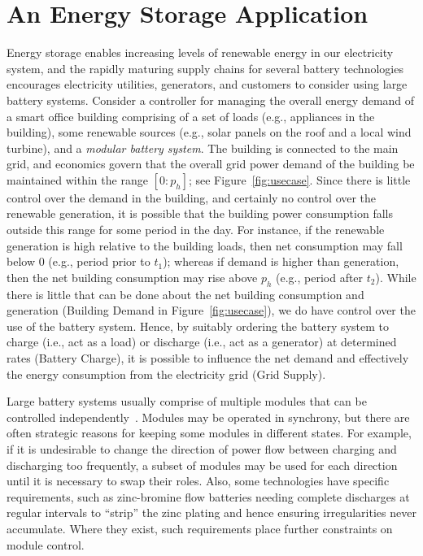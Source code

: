 \section{An Energy Storage Application}\label{sec:application}



Energy storage enables increasing levels of renewable energy in our electricity system, and the rapidly maturing supply chains for several battery technologies encourages electricity utilities, generators, and customers to consider using large battery systems. 
Consider a controller for managing the overall energy demand of a smart office building comprising of a set of loads (e.g., appliances in the building), some renewable sources (e.g., solar panels on the roof and a local wind turbine), and a \emph{modular battery system}. The building is connected to the main grid, and economics govern that the overall grid power demand of the building be maintained within the range $[0:p_h]$; see Figure~\ref{fig:usecase}. 
Since there is little control over the demand in the building, and certainly no control over the renewable generation, it is possible that the building power consumption falls outside this range for some period in the day. For instance, if the renewable generation is high relative to the building loads, then net consumption may fall below $0$ (e.g., period prior to $t_1$); whereas if demand is higher than generation, then the net building consumption may rise above $p_h$ (e.g., period after $t_2$). 
%
While there is little that can be done about the net building consumption and generation (Building Demand in Figure~\ref{fig:usecase}),
we do have control over the use of the battery system. Hence, by suitably ordering the battery system to charge (i.e., act as a load) or discharge (i.e., act as a generator) at determined rates (Battery Charge), it is possible to influence the net demand and effectively the energy consumption from the electricity grid (Grid Supply).

Large battery systems usually comprise of multiple modules that can be controlled independently~\cite{norris02:grid}.  Modules may be operated in synchrony, but there are often strategic reasons for keeping some modules in different states.  For example, if it is undesirable to change the direction of power flow between charging and discharging too frequently, a subset of modules may be used for each direction until it is necessary to swap their roles. Also, some technologies have specific requirements, such as zinc-bromine flow batteries needing complete discharges at regular intervals to ``strip'' the zinc plating and hence ensuring irregularities never accumulate. Where they exist, such requirements place further constraints on module control.

